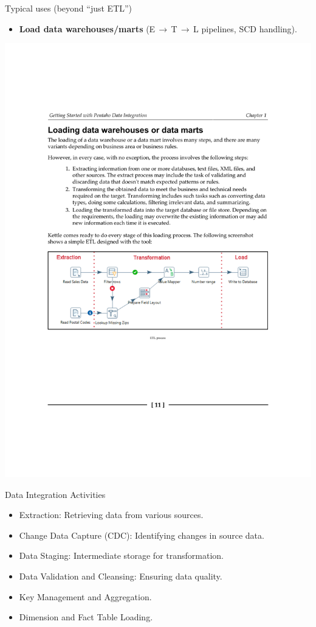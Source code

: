 \documentclass[aspectratio=169]{beamer}
\begin{document}
\begin{frame}{Typical uses (beyond ``just ETL'')}
    \begin{itemize}
        \item \textbf{Load data warehouses/marts} (E\,$\rightarrow$\,T\,$\rightarrow$\,L pipelines, SCD handling).
    \end{itemize}
    \centering
    \includegraphics[width=\textwidth, trim={2.5cm 10cm 2.5cm 14cm}, clip]{figures/etl_uses}
\end{frame}

\begin{frame}{Data Integration Activities}
    \begin{itemize}
        \item Extraction: Retrieving data from various sources.
        \item Change Data Capture (CDC): Identifying changes in source data.
        \item Data Staging: Intermediate storage for transformation.
        \item Data Validation and Cleansing: Ensuring data quality.
        \item Key Management and Aggregation.
        \item Dimension and Fact Table Loading.
    \end{itemize}
\end{frame}
\end{document}
